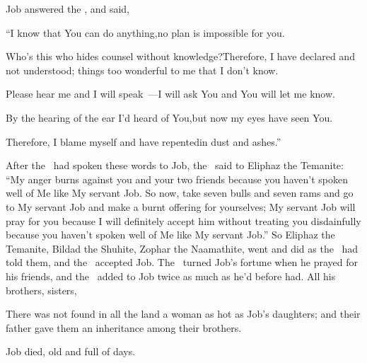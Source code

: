 
\begin{inparaenum}
   Job answered the \lord, and said,\smallskip%

  \pb{} ``I know that You can do anything,\pa{}no plan is impossible for you.%

  \pb{} Who's this who hides counsel without knowledge?\pa{}Therefore, I have declared and not understood; things too wonderful to me that I don't know.%

  \pb{} Please hear me and I will speak~---\pa{}I will ask You and You will let me know.%

  \pb{} By the hearing of the ear I'd heard of You,\pa{}but now my eyes have seen You.%

  \pb{} Therefore, I blame myself and have repented\pa{}in dust and ashes.''\smallskip%

   After the \lord\ had spoken these words to Job, the \lord\ said to Eliphaz the Temanite: ``My anger burns against you and your two friends because you haven't spoken well of Me like My servant Job.%
   So now, take seven bulls and seven rams and go to My servant Job and make a burnt offering for yourselves; My servant Job will pray for you because I will definitely accept him without treating you disdainfully because you haven't spoken well of Me like My servant Job.''%
   So Eliphaz the Temanite, Bildad the Shuhite, Zophar the Naamathite, went and did as the \lord\ had told them, and the \lord\ accepted Job.%
   The \lord\ turned Job's fortune when he prayed for his friends, and the \lord\ added to Job twice as much as he'd before had.%
   All his brothers, sisters, %

   There was not found in all the land a woman as hot as Job's daughters; and their father gave them an inheritance among their brothers.%

   Job died, old and full of days.%
\end{inparaenum}
